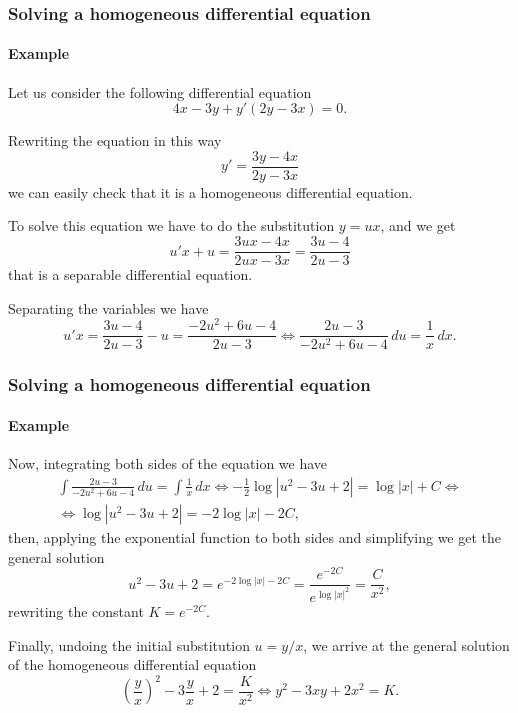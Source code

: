 \begin{frame}
\frametitle{Solving a homogeneous differential equation}
\framesubtitle{Example}
Let us consider the following differential equation
\[
4x-3y+y'(2y-3x)=0.
\]

Rewriting the equation in this way
\[
y'=\frac{3y-4x}{2y-3x}
\]
we can easily check that it is a homogeneous differential equation.

To solve this equation we have to do the substitution $y=ux$, and we get
\[
u'x+u=\frac{3ux-4x}{2ux-3x}=\frac{3u-4}{2u-3}
\]
that is a separable differential equation.

Separating the variables we have
\[
u'x=\frac{3u-4}{2u-3}-u=\frac{-2u^2+6u-4}{2u-3}\Leftrightarrow \frac{2u-3}{-2u^2+6u-4}\,du=\frac{1}{x}\,dx.
\]
\end{frame}


\begin{frame}
\frametitle{Solving a homogeneous differential equation}
\framesubtitle{Example}
Now, integrating both sides of the equation we have
\[
\renewcommand{\arraystretch}{2}
\begin{array}{c}
\displaystyle \int \frac{2u-3}{-2u^2+6u-4}\,du=\int \frac{1}{x}\,dx
\Leftrightarrow -\frac{1}{2}\log|u^2-3u+2|=\log|x|+C \Leftrightarrow\\
\Leftrightarrow \log|u^2-3u+2|=-2\log|x|-2C,
\end{array}
\]
then, applying the exponential function to both sides and simplifying we get the general solution 
\[
u^2-3u+2=e^{-2\log|x|-2C}=\frac{e^{-2C}}{e^{\log|x|^2}}=\frac{C}{x^2},
\]
rewriting the constant $K=e^{-2C}$.

Finally, undoing the initial substitution $u=y/x$, we arrive at the general solution of the homogeneous differential equation
\[
\left(\frac{y}{x}\right)^2-3\frac{y}{x}+2=\frac{K}{x^2}\Leftrightarrow y^2-3xy+2x^2=K.
\]
\end{frame}



